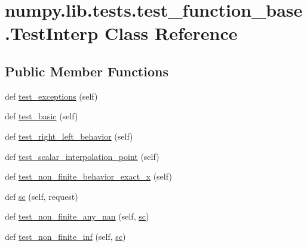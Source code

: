 \hypertarget{classnumpy_1_1lib_1_1tests_1_1test__function__base_1_1TestInterp}{}\section{numpy.\+lib.\+tests.\+test\+\_\+function\+\_\+base.\+Test\+Interp Class Reference}
\label{classnumpy_1_1lib_1_1tests_1_1test__function__base_1_1TestInterp}
\subsection*{Public Member Functions}
\begin{DoxyCompactItemize}
\item 
def \hyperlink{classnumpy_1_1lib_1_1tests_1_1test__function__base_1_1TestInterp_a197abb25721f6f5484a9f09538c2bbac}{test\+\_\+exceptions} (self)
\item 
def \hyperlink{classnumpy_1_1lib_1_1tests_1_1test__function__base_1_1TestInterp_ac457ec04b372bdfb223f0545871e4e6d}{test\+\_\+basic} (self)
\item 
def \hyperlink{classnumpy_1_1lib_1_1tests_1_1test__function__base_1_1TestInterp_a4fa98c1e0d5b2c7e156ba3efa7692361}{test\+\_\+right\+\_\+left\+\_\+behavior} (self)
\item 
def \hyperlink{classnumpy_1_1lib_1_1tests_1_1test__function__base_1_1TestInterp_aa0ba912ceff51b3e25cde4aaea0ca5da}{test\+\_\+scalar\+\_\+interpolation\+\_\+point} (self)
\item 
def \hyperlink{classnumpy_1_1lib_1_1tests_1_1test__function__base_1_1TestInterp_af360fbf325353c391b406037918e5ca4}{test\+\_\+non\+\_\+finite\+\_\+behavior\+\_\+exact\+\_\+x} (self)
\item 
def \hyperlink{classnumpy_1_1lib_1_1tests_1_1test__function__base_1_1TestInterp_ab4e8541cde248a5e7352cf3967d9d625}{sc} (self, request)
\item 
def \hyperlink{classnumpy_1_1lib_1_1tests_1_1test__function__base_1_1TestInterp_a0498c029546804c8bcd5bdacf133dafb}{test\+\_\+non\+\_\+finite\+\_\+any\+\_\+nan} (self, \hyperlink{classnumpy_1_1lib_1_1tests_1_1test__function__base_1_1TestInterp_ab4e8541cde248a5e7352cf3967d9d625}{sc})
\item 
def \hyperlink{classnumpy_1_1lib_1_1tests_1_1test__function__base_1_1TestInterp_af4fe3d1585ca9553c7054ddffc8ca81f}{test\+\_\+non\+\_\+finite\+\_\+inf} (self, \hyperlink{classnumpy_1_1lib_1_1tests_1_1test__function__base_1_1TestInterp_ab4e8541cde248a5e7352cf3967d9d625}{sc})

\end{DoxyCompactItemize}
